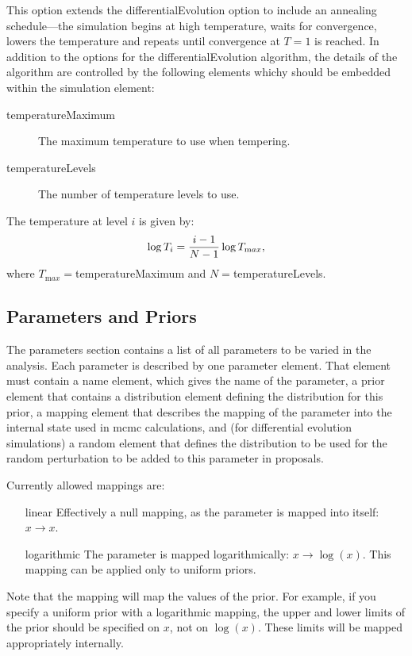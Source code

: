 This option extends the {\normalfont \ttfamily differentialEvolution} option to include an annealing schedule---the simulation begins at high temperature, waits for convergence, lowers the temperature and repeats until convergence at $T=1$ is reached. In addition to the options for the {\normalfont \ttfamily differentialEvolution} algorithm, the details of the algorithm are controlled by the following elements whichy should be embedded within the {\normalfont \ttfamily simulation} element:
\begin{description}
\item[{\normalfont \ttfamily temperatureMaximum}] The maximum temperature to use when tempering.
\item[{\normalfont \ttfamily temperatureLevels}] The number of temperature levels to use.
\end{description}

The temperature at level $i$ is given by:
\begin{equation}
\log T_i = {i-1 \over N-1} \log T_{\mathrm max},
\end{equation}
where $T_{\mathrm max}=${\normalfont \ttfamily temperatureMaximum} and $N=${\normalfont \ttfamily temperatureLevels}.

\subsection{Parameters and Priors}\label{sec:ParametersPriors}

The {\normalfont \ttfamily parameters} section contains a list of all parameters to be varied in the analysis. Each parameter is described by one {\normalfont \ttfamily parameter} element. That element must contain a {\normalfont \ttfamily name} element, which gives the name of the parameter, a {\normalfont \ttfamily prior} element that contains a {\normalfont \ttfamily distribution} element defining the distribution for this prior, a {\normalfont \ttfamily mapping} element that describes the mapping of the parameter into the internal state used in \gls{mcmc} calculations, and (for differential evolution simulations) a {\normalfont \ttfamily random} element that defines the distribution to be used for the random perturbation to be added to this parameter in proposals.

Currently allowed mappings are:
\begin{itemize}
\item[{\normalfont \ttfamily linear}] Effectively a null mapping, as the parameter is mapped into itself: $x \rightarrow x$.
\item[{\normalfont \ttfamily logarithmic}] The parameter is mapped logarithmically: $x \rightarrow \log(x)$. This mapping can be applied only to uniform priors.
\end{itemize}
Note that the mapping will map the values of the prior. For example, if you specify a uniform prior with a logarithmic mapping, the upper and lower limits of the prior should be specified on $x$, not on $\log(x)$. These limits will be mapped appropriately internally.

